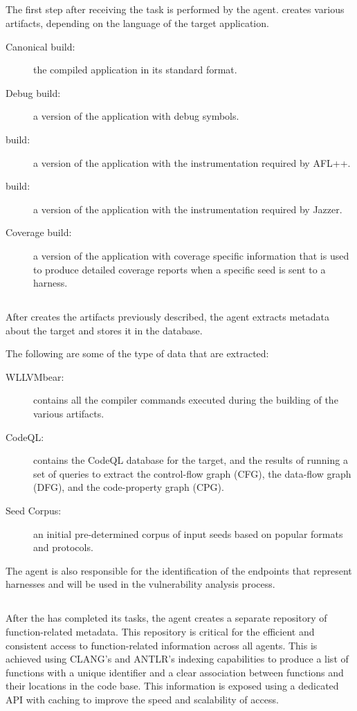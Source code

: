 \subsection{\builder}
The first step after receiving the task is performed by the \builder agent.
\builder creates various artifacts, depending on the language of the target application.
\begin{description}
\item[Canonical build:] the compiled application in its standard format.
\item[Debug build:] a version of the application with debug symbols.
\item[\afluzzer build:] a version of the application with the instrumentation required by AFL++.
\item[\jazzmine build:] a version of the application with the instrumentation required by Jazzer.
\item[Coverage build:] a version of the application with coverage specific information that is used to produce detailed coverage reports when a specific seed is sent to a harness.
\end{description}

\subsection{\analyzer}
After \builder creates the artifacts previously described, the \analyzer agent extracts metadata about the target and stores it in the \analysisgraph database.

The following are some of the type of data that are extracted:
\begin{description}
\item[WLLVMbear:] contains all the compiler commands executed during the building of the various artifacts.
\item[CodeQL:] contains the CodeQL database for the target, and the results of running a set of queries to extract the control-flow graph (CFG), the data-flow graph (DFG), and the code-property graph (CPG).
\item[Seed Corpus:] an initial pre-determined corpus of input seeds based on popular formats and protocols.
\end{description}
The \analyzer agent is also responsible for the identification of the endpoints that represent harnesses and will be used in the vulnerability analysis process.

\subsection{\indexer}
After the \analyzer has completed its tasks, the \indexer agent creates a separate repository of function-related metadata.
This repository is critical for the efficient and consistent access to function-related information across all agents.
This is achieved using CLANG's and ANTLR's indexing capabilities to produce a list of functions with a unique identifier and a clear association between functions and their locations in the code base.
This information is exposed using a dedicated API with caching to improve the speed and scalability of access.

